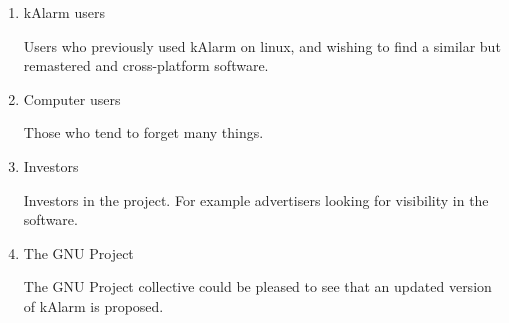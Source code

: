 \begin{enumerate}
	\item kAlarm users
	\par Users who previously used kAlarm on linux, and wishing to find a similar but remastered and cross-platform software.
	\item Computer users
	\par Those who tend to forget many things.
	\item Investors
	\par Investors in the project. For example advertisers looking for visibility in the software.
	\item The GNU Project
	\par The GNU Project collective could be pleased to see that an updated version of kAlarm is proposed.
\end{enumerate}